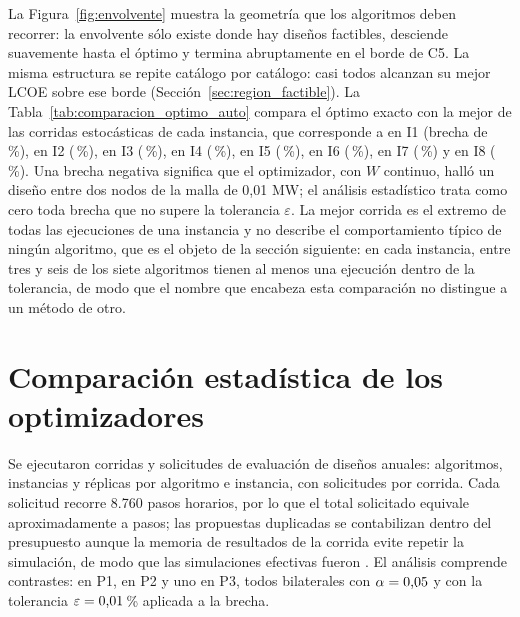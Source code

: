 La Figura~\ref{fig:envolvente} muestra la geometría que los algoritmos deben recorrer: la envolvente sólo existe donde hay diseños factibles, desciende suavemente hasta el óptimo y termina abruptamente en el borde de C5. La misma estructura se repite catálogo por catálogo: casi todos alcanzan su mejor LCOE sobre ese borde (Sección~\ref{sec:region_factible}). La Tabla~\ref{tab:comparacion_optimo_auto} compara el óptimo exacto con la mejor de las corridas estocásticas de cada instancia, que corresponde a \BestRunAAlgorithm{} en I1 (brecha de \BestRunAGapPct\,\%), \BestRunBAlgorithm{} en I2 (\BestRunBGapPct\,\%), \BestRunCAlgorithm{} en I3 (\BestRunCGapPct\,\%), \BestRunDAlgorithm{} en I4 (\BestRunDGapPct\,\%), \BestRunEAlgorithm{} en I5 (\BestRunEGapPct\,\%), \BestRunFAlgorithm{} en I6 (\BestRunFGapPct\,\%), \BestRunGAlgorithm{} en I7 (\BestRunGGapPct\,\%) y \BestRunHAlgorithm{} en I8 (\BestRunHGapPct\,\%). Una brecha negativa significa que el optimizador, con $W$ continuo, halló un diseño entre dos nodos de la malla de 0,01 MW; el análisis estadístico trata como cero toda brecha que no supere la tolerancia $\varepsilon$. La mejor corrida es el extremo de todas las ejecuciones de una instancia y no describe el comportamiento típico de ningún algoritmo, que es el objeto de la sección siguiente: en cada instancia, entre tres y seis de los siete algoritmos tienen al menos una ejecución dentro de la tolerancia, de modo que el nombre que encabeza esta comparación no distingue a un método de otro.

\TablaComparacionOptimoAuto

\section{Comparación estadística de los optimizadores}
\label{sec:comparacion}

Se ejecutaron \TotalRuns{} corridas y \TotalDesignRequests{} solicitudes de evaluación de diseños anuales: \NAlgorithms{} algoritmos, \NInstances{} instancias y \Replicates{} réplicas por algoritmo e instancia, con \RequestsPerRun{} solicitudes por corrida. Cada solicitud recorre 8.760 pasos horarios, por lo que el total solicitado equivale aproximadamente a \RequestedHourlySteps{} pasos; las propuestas duplicadas se contabilizan dentro del presupuesto aunque la memoria de resultados de la corrida evite repetir la simulación, de modo que las simulaciones efectivas fueron \SimulationsTotal. El análisis comprende \StatTestsTotal{} contrastes: \StatTestsPerInstance{} en P1, \StatTestsGlobal{} en P2 y uno en P3, todos bilaterales con $\alpha=\text{0,05}$ y con la tolerancia $\varepsilon=\text{0,01}$\,\% aplicada a la brecha.


